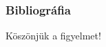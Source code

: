 \begin{frame}
	\frametitle{Bibliográfia}
	
	
\end{frame}

\begin{frame}
	\Huge{\centerline{Köszönjük a figyelmet!}}
\end{frame}